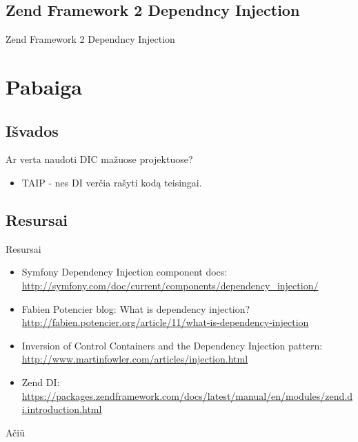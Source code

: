 \documentclass[12pt,a4paper]{beamer}
\begin{document}
\subsection{Zend Framework 2 Dependncy Injection}
\begin{frame}
	\begin{center}
        {\Huge Zend Framework 2 Dependncy Injection}
	\end{center}
\end{frame}

\section{Pabaiga}

\subsection{Išvados}
\begin{frame}{Ar verta naudoti DIC mažuose projektuose?}
    \begin{itemize}
        \item TAIP - nes DI verčia rašyti kodą teisingai.
    \end{itemize}
\end{frame}

\subsection{Resursai}
\begin{frame}{Resursai}
    \begin{itemize}
        \item Symfony Dependency Injection component docs: \url{http://symfony.com/doc/current/components/dependency_injection/}
        \item Fabien Potencier blog: What is dependency injection? \url{http://fabien.potencier.org/article/11/what-is-dependency-injection}
        \item Inversion of Control Containers and the Dependency Injection pattern: \url{http://www.martinfowler.com/articles/injection.html}
        \item Zend DI: \url{https://packages.zendframework.com/docs/latest/manual/en/modules/zend.di.introduction.html}
    \end{itemize}
\end{frame}

\begin{frame}
	\begin{center}
        {\Huge Ačiū}
	\end{center}
\end{frame}
\end{document}
